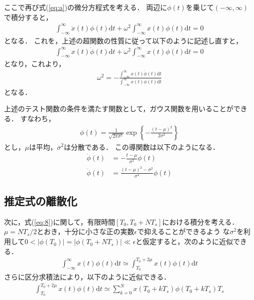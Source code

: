 \documentclass{ieej}
\begin{document}
ここで再び式(\ref{eq:a})の微分方程式を考える．
両辺に$\phi(t)$を乗じて$(-\infty,\infty)$で積分すると，
\begin{align}
 \int_{-\infty}^{\infty}\ddot{x}(t)\phi (t) \mbox{d}t+
 \omega^2 \int_{-\infty}^{\infty}x(t)\phi (t)\mbox{d}t=0
\end{align}
となる．
これを，上述の超関数の性質に従って以下のように記述し直すと，
\begin{align}
 \int_{-\infty}^{\infty}x(t)\ddot{\phi} (t) \mbox{d}t+
 \omega^2 \int_{-\infty}^{\infty}x(t)\phi (t)\mbox{d}t=0
\end{align}
となり，これより，
\begin{align}
\omega^2=-\frac{
 \int_{-\infty}^{\infty}x(t)\ddot{\phi} (t) \mbox{d}t}{
  \int_{-\infty}^{\infty}x(t)\phi (t)\mbox{d}t}
\label{eq:8}
\end{align}
となる．

上述のテスト関数の条件を満たす関数として，ガウス関数を用いることができる．
すなわち，
\begin{align}
\phi(t)=\frac{1}{\sqrt{2\pi \sigma^2}}\exp \left\{-\frac{(t-\mu)^2}{2\sigma^2}\right\}
\end{align}
とし，$\mu$は平均，$\sigma^2$は分散である．
この導関数は以下のようになる．
\begin{align}
\dot{\phi}(t)&=-\frac{t-\mu}{\sigma^2}\phi(t)\\
\ddot{\phi}(t)&=\frac{(t-\mu)^2-\sigma^2}{\sigma^4}\phi(t)
\end{align}

\subsection{推定式の離散化}

次に，式(\ref{eq:8})に関して，有限時間$[T_0, T_0+NT_s]$における積分を考える．
$\mu=NT_s/2$とおき，十分に小さな正の実数$\epsilon$で抑えることができるよう
な$\sigma^2$を利用して$0< \vert \phi(T_0) \vert=\vert \phi(T_0+NT_s) \vert　\ll
\epsilon$と仮定すると，次のように近似できる．
\begin{align}
 \int^{\infty}_{-\infty}x(t)\phi(t)\mbox{d}t \simeq 
 \int^{T_0+2\mu}_{T_0}x(t)\phi(t)\mbox{d}t 
\end{align}
さらに区分求積法により，以下のように近似できる．
\begin{align}
 \int^{T_0+2\mu}_{T_0}  x(t)\phi(t)\mbox{d}t  \simeq
 \sum^{N}_{k=0} x(T_0+kT_s)\phi(T_0+kT_s)T_s
\end{align}
\end{document}
